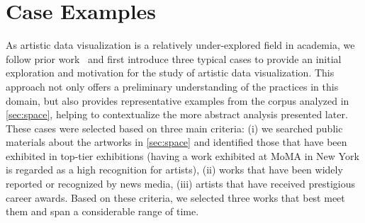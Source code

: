 \section{Case Examples}
\label{sec:case}





As artistic data visualization is a relatively under-explored field in academia, we follow prior work~\cite{segel2010narrative,shi2021communicating} and first introduce three typical cases to provide an initial exploration and motivation for the study of artistic data visualization. This approach not only offers a preliminary understanding of the practices in this domain, but also provides representative examples from the corpus analyzed in \autoref{sec:space}, helping to contextualize the more abstract analysis presented later.
These cases were selected based on three main criteria: (i) we searched public materials about the artworks in \autoref{sec:space} and identified those that have been exhibited in top-tier exhibitions (\eg having a work exhibited at MoMA in New York is regarded as a high recognition for artists), (ii) works that have been widely reported or recognized by news media, (iii) artists that have received prestigious career awards. Based on these criteria, we selected three works that best meet them and span a considerable range of time.





